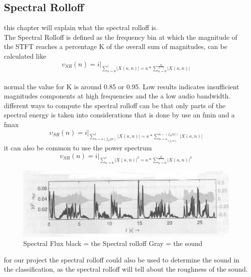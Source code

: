 \subsection{Spectral Rolloff}
this chapter will explain what the spectral rolloff is.\\
The Spectral Rolloff is defined as the frequency bin at which the magnitude of the STFT reaches a percentage K of the overall sum of magnitudes, can be calculated like\citep{ACA}\\
\begin{equation}\label{ eq:normal spectral rolloff}
	\upsilon_{SR}(n) = i \vert _{\displaystyle\sum_{\kappa = 0}^i \vert X(\kappa, n) \vert = \kappa * \displaystyle\sum_{\kappa = 0}^ {\frac{K}{2-1}}\vert X(\kappa, n) \vert}
\end{equation}
\\
normal the value for K is around 0.85 or 0.95. Low results indicates insufficient magnitudes components at high frequencies and the a low audio bandwidth\citep{ACA}.\\
different ways to compute the spectral rolloff can be that only parts of the spectral energy is taken into considerations that is done by use an fmin and a fmax\citep{ACA}
\begin{equation}\label{ eq: fmin and fmax spectral rolloff}
	\upsilon_{SR}(n) = i \vert _{\displaystyle\sum_{\kappa = \kappa(f_min)}^i \vert X(\kappa, n) \vert = \kappa * \displaystyle\sum_{\kappa = \kappa_(f_min)}^ {\kappa-(f_max)}\vert X(\kappa, n) \vert}
\end{equation}
it can also be common to use the power spectrum
\begin{equation}\label{ eq:power spectral rolloff}
	\upsilon_{SR}(n) = i \vert _{\displaystyle\sum_{\kappa = 0}^i \vert X(\kappa, n) \vert^2 = \kappa * \displaystyle\sum_{\kappa = 0}^ {\frac{K}{2-1}}\vert X(\kappa, n) \vert^2}
\end{equation}
\begin{figure}[h]
	\begin{center}
		\includegraphics[scale = 0.5]{fig/spectral_rolloff.jpg}
		\caption{Spectral Flux black = the Spectral rolloff Gray = the sound \citep{ACA}}
		\label{Spectral rolloff pic}
	\end{center}
\end{figure}
for our project the spectral rolloff could also be used to determine the sound in the classification, as the spectral rolloff will tell about the roughness of the sound. 


